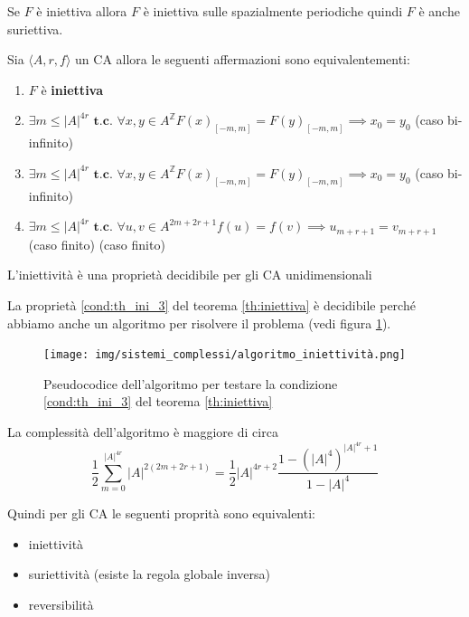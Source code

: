 \begin{teorema}
    Se $F$ è iniettiva allora $F$ è iniettiva sulle spazialmente periodiche quindi
    $F$ è anche suriettiva.
\end{teorema}

\begin{teorema}
    \label{th:iniettiva}
    Sia $\langle A,r,f\rangle$ un CA allora le seguenti affermazioni sono equivalentementi:
    \begin{enumerate}
        \item $F$ è \textbf{iniettiva}
        \item $\exists m \le |A|^{4r} \textbf{ t.c. } \forall x, y \in A^\mathbb{Z} F(x)_{[-m,m]}=F(y)_{[-m,m]} \implies x_0=y_0$
              (caso bi-infinito)
        \item $\exists m \le |A|^{4r} \textbf{ t.c. } \forall x, y \in A^\mathbb{Z} F(x)_{[-m,m]}=F(y)_{[-m,m]} \implies x_0=y_0$
              (caso bi-infinito)
        \item \label{cond:th_ini_3}$\exists m \le |A|^{4r} \textbf{ t.c. } \forall u,v \in A^{2m+2r+1} f(u)= f(v) \implies u_{m+r+1} = v_{m+r+1}$
              (caso finito)
              (caso finito)
    \end{enumerate}
\end{teorema}
\begin{teorema}
    L'iniettività è una proprietà decidibile per gli CA unidimensionali


\end{teorema}
La proprietà \ref{cond:th_ini_3} del teorema \ref{th:iniettiva} è decidibile perché
abbiamo anche un algoritmo per risolvere il problema (vedi figura \ref{fig:algo_iniettiva}).
\begin{figure}[!h]
    \centering
    \texttt{[image: img/sistemi\_complessi/algoritmo\_iniettività.png]}
    \caption{Pseudocodice dell'algoritmo per testare la condizione \ref{cond:th_ini_3} del teorema \ref{th:iniettiva}}
    \label{fig:algo_iniettiva}
\end{figure}
\begin{nota}
    La complessità dell'algoritmo è maggiore di circa
    \begin{equation*}
        \frac{1}{2} \sum_{m=0}^{|A|^{4r}} |A|^{2(2m+2r+1)} = \frac{1}{2}  |A|^{4r+2}
        \frac{1-(|A|^4)^{|A|^{4r}+1}}{1-|A|^4}
    \end{equation*}
\end{nota}

Quindi per gli CA le seguenti proprità sono equivalenti:
\begin{itemize}
    \item iniettività
    \item suriettività (esiste la regola globale inversa)
    \item reversibilità
\end{itemize}

